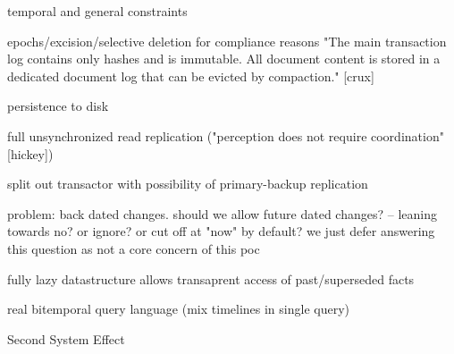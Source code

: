 temporal and general constraints

epochs/excision/selective deletion for compliance reasons
"The main transaction log contains only hashes and is immutable. All document content is stored in a dedicated document log that can be evicted by compaction." [crux]


persistence to disk

full unsynchronized read replication ("perception does not require coordination" [hickey])

split out transactor with possibility of primary-backup replication

problem: back dated changes. should we allow future dated changes? -- leaning towards no? or ignore? or cut off at "now" by default? we just defer answering this question as not a core concern of this poc


fully lazy datastructure allows transaprent access of past/superseded facts

real bitemporal query language (mix timelines in single query)

Second System Effect \cite{brooks1995mythical}
